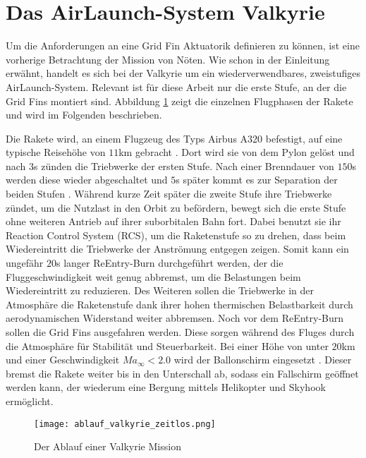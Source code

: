 \section{Das AirLaunch-System Valkyrie}
Um die Anforderungen an eine Grid Fin Aktuatorik definieren zu können, ist eine vorherige Betrachtung der Mission von Nöten. Wie schon in der Einleitung erwähnt, handelt es sich bei der Valkyrie um ein wiederverwendbares, zweistufiges AirLaunch-System.  Relevant ist für diese Arbeit nur die erste Stufe, an der die Grid Fins montiert sind. Abbildung \ref{abb_valkMission} zeigt die einzelnen Flugphasen der Rakete und wird im Folgenden beschrieben.

Die Rakete wird, an einem Flugzeug des Typs Airbus A320 befestigt, auf eine typische Reisehöhe von $11$km gebracht \cite{flugbahnBarz}. Dort wird sie von dem Pylon gelöst und nach $3$s zünden die Triebwerke der ersten Stufe. Nach einer Brenndauer von $150$s werden diese wieder abgeschaltet und $5$s später kommt es zur Separation der beiden Stufen \cite{flugbahnBarz}. Während kurze Zeit später die zweite Stufe ihre Triebwerke zündet, um die Nutzlast in den Orbit zu befördern, bewegt sich die erste Stufe ohne weiteren Antrieb auf ihrer suborbitalen Bahn fort. Dabei benutzt sie ihr Reaction Control System (RCS), um die Raketenstufe so zu drehen, dass beim Wiedereintritt die Triebwerke der Anströmung entgegen zeigen. Somit kann ein ungefähr $20$s langer ReEntry-Burn durchgeführt werden, der die Fluggeschwindigkeit weit genug abbremst, um die Belastungen beim Wiedereintritt zu reduzieren. Des Weiteren sollen die Triebwerke in der Atmosphäre die Raketenstufe dank ihrer hohen thermischen Belastbarkeit durch aerodynamischen Widerstand weiter abbremsen. Noch vor dem ReEntry-Burn sollen die Grid Fins ausgefahren werden. Diese sorgen während des Fluges durch die Atmosphäre für Stabilität und Steuerbarkeit. Bei einer Höhe von unter $20$km und einer Geschwindigkeit $Ma_\infty<2.0$ wird der Ballonschirm eingesetzt \cite{flugbahnBarz}. Dieser bremst die Rakete weiter bis in den Unterschall ab, sodass ein Fallschirm geöffnet werden kann, der wiederum eine Bergung mittels Helikopter und Skyhook ermöglicht.
\begin{figure}[h]
	\centering
	\texttt{[image: ablauf\_valkyrie\_zeitlos.png]}
	\begin{flushright}
	\end{flushright}
	\caption{Der Ablauf einer Valkyrie Mission}
	\label{abb_valkMission}
\end{figure}\\
